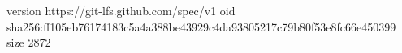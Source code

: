 version https://git-lfs.github.com/spec/v1
oid sha256:ff105eb76174183c5a4a388be43929c4da93805217c79b80f53e8fc66e450399
size 2872

